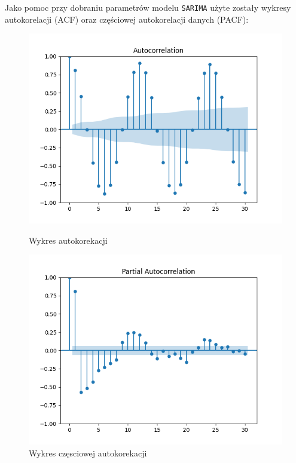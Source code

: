 \documentclass[12pt]{article}
\begin{document}
Jako pomoc przy dobraniu parametrów modelu \texttt{SARIMA} użyte zostały wykresy autokorelacji (ACF) oraz częściowej autokorelacji danych (PACF):

\begin{figure}[H]
    \begin{minipage}{.5\textwidth}
        \includegraphics[width=\textwidth]{img/acf.png}
        \caption{Wykres autokorekacji}
    \end{minipage}
    \begin{minipage}{.5\textwidth}
        \includegraphics[width=\textwidth]{img/pacf.png}
        \caption{Wykres częsciowej autokorekacji}
    \end{minipage}
\end{figure}
\end{document}
